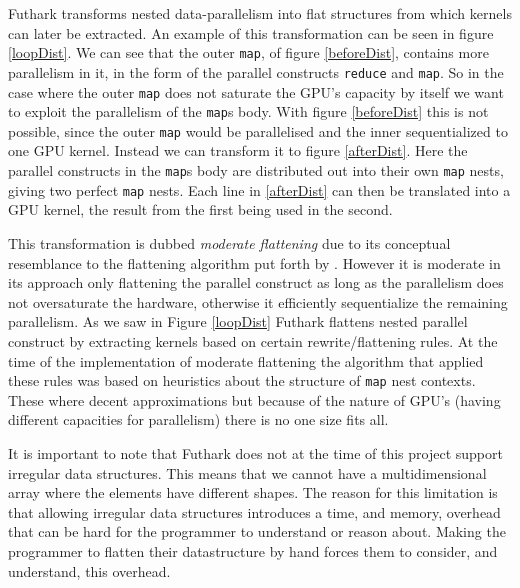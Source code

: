 \noindent Futhark transforms nested data-parallelism into flat structures from
which kernels can later be extracted. An example of this transformation can
be seen in figure \ref{loopDist}. We can see that the outer \texttt{map}, of
figure \ref{beforeDist}, contains more parallelism in it, in the form of the
parallel constructs \texttt{reduce} and \texttt{map}. So in the case where the
outer \texttt{map} does not saturate the GPU's capacity by itself we want to
exploit the parallelism of the \texttt{map}s body. With figure \ref{beforeDist}
this is not possible, since the outer \texttt{map} would be parallelised and
the inner sequentialized to one GPU kernel. Instead we can transform it to
figure \ref{afterDist}. Here the parallel constructs in the \texttt{map}s
body are distributed out into their own \texttt{map} nests, giving two perfect
\texttt{map} nests. Each line in \ref{afterDist} can then be translated into a
GPU kernel, the result from the first being used in the second.

This transformation is dubbed \textit{moderate flattening}
\cite{futhark-nested-para} due to its conceptual resemblance to the flattening
algorithm put forth by \citeauthor{flat} \cite{flat}. However it is moderate in
its approach only flattening the parallel construct as long as the parallelism
does not oversaturate the hardware, otherwise it efficiently sequentialize the remaining
parallelism. As we saw in Figure \ref{loopDist} Futhark flattens nested
parallel construct by extracting kernels based on certain rewrite/flattening
rules\cite{futhark-nested-para}. At the time of the implementation of moderate
flattening the algorithm that applied these rules was based on heuristics about
the structure of \texttt{map} nest contexts. These where decent approximations
but because of the nature of GPU's (having different capacities for
parallelism) there is no one size fits all.
 
It is important to note that Futhark does not at the time of this project 
support irregular data structures. This means that we cannot have a 
multidimensional array where the elements have different shapes. The reason for 
this limitation is that allowing irregular data structures introduces a time, 
and memory, overhead that can be hard for the programmer to understand or 
reason about. Making the programmer to flatten their datastructure by hand 
forces them to consider, and understand, this overhead.\cite{expansion} 

